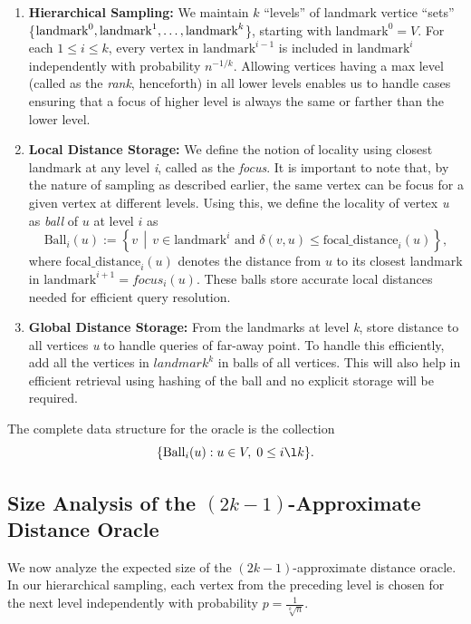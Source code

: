 \documentclass{article}
\begin{document}
\begin{enumerate}
    \item \textbf{Hierarchical Sampling:} We maintain \( k \) ``levels'' of landmark vertice ``sets'' \{\( \text{landmark}^0, \\ \text{landmark}^1, \ldots, \text{landmark}^k \)\}, starting with \( \text{landmark}^0 = V \). For each \( 1 \le i \le k \), every vertex in \( \text{landmark}^{i-1} \) is included in \( \text{landmark}^i \) independently with probability \( n^{-1/k} \). Allowing vertices having a max level (called as the \emph{rank}, henceforth) in all lower levels enables us to handle cases ensuring that a focus of higher level is always the same or farther than the lower level.

    \item \textbf{Local Distance Storage:} We define the notion of locality using closest landmark at any level \textit{i}, called as the \emph{focus}. It is important to note that, by the nature of sampling as described earlier, the same vertex can be focus for a given vertex at different levels.
    Using this, we define the locality of vertex \textit{u} as \emph{ball} of \( u \) at level \( i \) as
    \[
    \text{Ball}_i(u) := \left\{ v \,\middle|\, v \in \text{landmark}^i \text{ and } \delta(v, u) \le \text{focal\_distance}_i(u) \right\},
    \]
    where \( \text{focal\_distance}_i(u) \) denotes the distance from \( u \) to its closest landmark in \( \text{landmark}^{i+1} = focus_i(u)\). These balls store accurate local distances needed for efficient query resolution.

    \item \textbf{Global Distance Storage:} From the landmarks at level \textit{k}, store distance to 
    all vertices \textit{u} to handle queries of far-away point. To handle this efficiently, add all the vertices in \(landmark^k\) in balls of all vertices. This will also help in efficient retrieval using hashing of the ball and no explicit storage will be required. 
\end{enumerate}

The complete data structure for the oracle is the collection
\[
\{\text{Ball}_i(u) : u \in V,\; 0 \le i \l k\}.
\]

\subsection{Size Analysis of the \((2k-1)\)-Approximate Distance Oracle}

We now analyze the expected size of the \((2k-1)\)-approximate distance oracle.  In our hierarchical sampling, each vertex from the preceding level is chosen for the next level independently with probability 
\(
p = \frac{1}{\sqrt[k]{n}}.
\)
\end{document}

